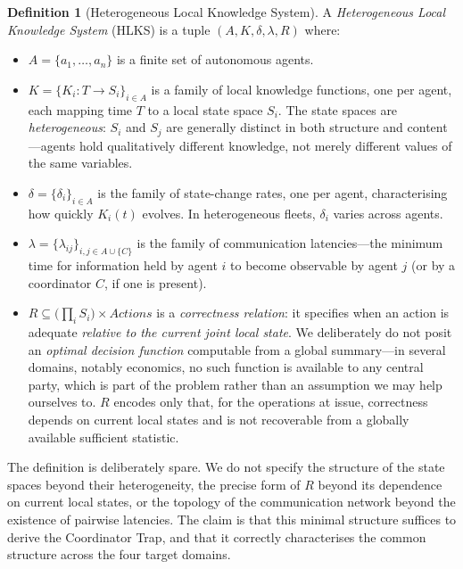 \documentclass[11pt]{article}
\theoremstyle{definition}
\newtheorem{definition}{Definition}
\theoremstyle{plain}
\theoremstyle{plain}
\begin{document}
\begin{definition}[Heterogeneous Local Knowledge System]
A \emph{Heterogeneous Local Knowledge System} (HLKS) is a tuple
$(A, K, \delta, \lambda, R)$ where:
\begin{itemize}
\item $A = \{a_1, \ldots, a_n\}$ is a finite set of autonomous agents.
\item $K = \{K_i : T \to S_i\}_{i \in A}$ is a family of local knowledge
  functions, one per agent, each mapping time $T$ to a local state space
  $S_i$. The state spaces are \emph{heterogeneous}: $S_i$ and $S_j$ are
  generally distinct in both structure and content---agents hold qualitatively
  different knowledge, not merely different values of the same variables.
\item $\delta = \{\delta_i\}_{i \in A}$ is the family of state-change rates,
  one per agent, characterising how quickly $K_i(t)$ evolves. In heterogeneous
  fleets, $\delta_i$ varies across agents.
\item $\lambda = \{\lambda_{ij}\}_{i,j \in A \cup \{C\}}$ is the family of
  communication latencies---the minimum time for information held by agent
  $i$ to become observable by agent $j$ (or by a coordinator $C$, if one is
  present).
\item $R \subseteq \bigl(\prod_i S_i\bigr) \times \mathit{Actions}$ is a
  \emph{correctness relation}: it specifies when an action is adequate
  \emph{relative to the current joint local state}. We deliberately do not posit an
  \emph{optimal decision function} computable from a global summary---in several
  domains, notably economics, no such function is available to any central party,
  which is part of the problem rather than an assumption we may help ourselves to.
  $R$ encodes only that, for the operations at issue, correctness depends on current
  local states and is not recoverable from a globally available sufficient statistic.
\end{itemize}
\end{definition}

The definition is deliberately spare. We do not specify the structure of the
state spaces beyond their heterogeneity, the precise form of $R$ beyond its
dependence on current local states, or the topology of the communication
network beyond the existence of pairwise latencies. The claim is that this
minimal structure suffices to derive the Coordinator Trap, and that it
correctly characterises the common structure across the four target domains.
\end{document}
